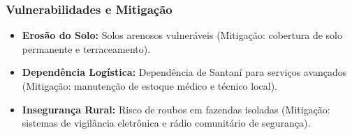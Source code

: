 \subsubsection{Vulnerabilidades e
Mitigação}

\begin{itemize}
\tightlist
\item
  \textbf{Erosão do Solo:} Solos arenosos vulneráveis (Mitigação:
  cobertura de solo permanente e terraceamento).
\item
  \textbf{Dependência Logística:} Dependência de Santaní para serviços
  avançados (Mitigação: manutenção de estoque médico e técnico local).
\item
  \textbf{Insegurança Rural:} Risco de roubos em fazendas isoladas
  (Mitigação: sistemas de vigilância eletrônica e rádio comunitário de
  segurança).
\end{itemize}

